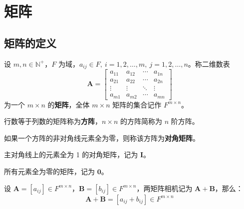 \section{矩阵}

\subsection{矩阵的定义}
\begin{definition}[矩阵 Matrix]
    设 $m,n\in\mathbb{N}^+$，$F$ 为域，$a_{ij}\in F,\ i=1,2,\ldots,m,\ j=1,2,\ldots,n$。称二维数表
    \[
        \mathbf{A} = \begin{bmatrix}
            a_{11} & a_{12} & \cdots & a_{1n} \\
            a_{21} & a_{22} & \cdots & a_{2n} \\
            \vdots & \vdots & \ddots & \vdots \\
            a_{m1} & a_{m2} & \cdots & a_{mn}
        \end{bmatrix}
    \]
    为一个 $m \times n$ 的\textbf{矩阵}，全体 $m \times n$ 矩阵的集合记作 $F^{m \times n}$。
\end{definition}

\begin{definition}
    行数等于列数的矩阵称为\textbf{方阵}，$n \times n$ 的方阵简称为 $n$ 阶方阵。
\end{definition}

\begin{definition}
    如果一个方阵的非对角线元素全为零，则称该方阵为\textbf{对角矩阵}。
\end{definition}

\begin{definition}
    主对角线上的元素全为 1 的对角矩阵，记为 $\mathbf{I}$。
\end{definition}

\begin{definition}
    所有元素全为零的矩阵，记为 $\mathbf{0}$。
\end{definition}

\begin{definition}
    设 $\mathbf{A} = [a_{ij}] \in F^{m \times n}$，$\mathbf{B} = [b_{ij}] \in F^{m \times n}$，两矩阵相机记为 $\mathbf{A} + \mathbf{B}$，那么：
    \[
       \mathbf{A} + \mathbf{B} = [a_{ij} + b_{ij}] \in F^{m \times n}
    \]
\end{definition}

